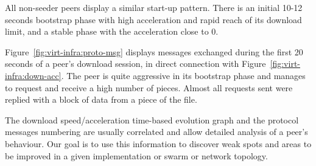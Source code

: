 All non-seeder peers display a similar start-up pattern. There is an initial
10-12 seconds bootstrap phase with high acceleration and rapid reach of its
download limit, and a stable phase with the acceleration close to 0.

Figure~\ref{fig:virt-infra:proto-msg} displays messages exchanged during the
first 20 seconds of a peer's download session, in direct connection with
Figure~\ref{fig:virt-infra:down-acc}. The peer is quite aggressive in its
bootstrap phase and manages to request and receive a high number of pieces.
Almost all requests sent were replied with a block of data from a piece of the
file.

The download speed/acceleration time-based evolution graph and the protocol
messages numbering are usually correlated and allow detailed analysis of a
peer's behaviour. Our goal is to use this information to discover weak spots
and areas to be improved in a given implementation or swarm or network
topology.
